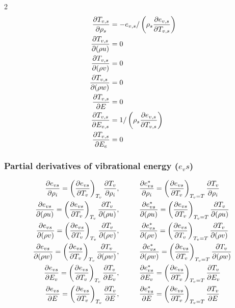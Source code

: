 \documentclass[10pt]{article}
\begin{document}
\begin{flushleft}
\begin{multicols}{2}
\begin{subequations}
    \begin{align}
    \frac{\partial T_{v,s}}{\partial \rho_s} &= -e_{v,s} / \left( \rho_s \frac{\partial e_{v,s}}{\partial T_{v,s}} \right)
    \\ \frac{\partial T_{v,s}}{\partial (\rho u)} &= 0
    \\ \frac{\partial T_{v,s}}{\partial (\rho v)} &= 0
    \\ \frac{\partial T_{v,s}}{\partial (\rho w)} &= 0
    \\ \frac{\partial T_{v,s}}{\partial E} &= 0
    \\ \frac{\partial T_{v,s}}{\partial E_{v,s}} &= 1 / \left( \rho_s \frac{\partial e_{v,s}}{\partial T_{v,s}} \right)
    \\ \frac{\partial T_{v,s}}{\partial E_e} &= 0
    \end{align}
\end{subequations}

\end{multicols}

\subsubsection{Partial derivatives of vibrational energy ($e_vs$)}

\begin{subequations}
    \begin{align}
        \pd{e_{vs}}{\rho_i} = \bp{\pd{e_{vs}}{T_v}}_{T_v} \pd{T_v}{\rho_i}, &\hspace{10mm} \pd{e_{vs}^*}{\rho_i} =  \bp{\pd{e_{vs}}{T_v}}_{T_v  = T} \pd{T_v}{\rho_i}
        \\ \pd{e_{vs}}{(\rho u)} = \bp{\pd{e_{vs}}{T_v}}_{T_v} \pd{T_v}{(\rho u)}, &\hspace{10mm} \pd{e_{vs}^*}{(\rho u)} = \bp{\pd{e_{vs}}{T_v}}_{T_v  = T} \pd{T_v}{(\rho u)}
        \\ \pd{e_{vs}}{(\rho v)} = \bp{\pd{e_{vs}}{T_v}}_{T_v} \pd{T_v}{(\rho v)}, &\hspace{10mm} \pd{e_{vs}^*}{(\rho v)} = \bp{\pd{e_{vs}}{T_v}}_{T_v  = T} \pd{T_v}{(\rho v)}
        \\ \pd{e_{vs}}{(\rho w)} = \bp{\pd{e_{vs}}{T_v}}_{T_v} \pd{T_v}{(\rho w)}, &\hspace{10mm} \pd{e_{vs}^*}{(\rho w)} = \bp{\pd{e_{vs}}{T_v}}_{T_v  = T} \pd{T_v}{(\rho w)}
        \\ \pd{e_{vs}}{E_v} = \bp{\pd{e_{vs}}{T_v}}_{T_v} \pd{T_v}{E_v}, &\hspace{10mm} \pd{e_{vs}^*}{E_v} = \bp{\pd{e_{vs}}{T_v}}_{T_v  = T} \pd{T_v}{E_v}
        \\ \pd{e_{vs}}{E} = \bp{\pd{e_{vs}}{T_v}}_{T_v} \pd{T_v}{E}, &\hspace{10mm} \pd{e_{vs}^*}{E} = \bp{\pd{e_{vs}}{T_v}}_{T_v  = T} \pd{T_v}{E}
    \end{align}    
\end{subequations}





\end{flushleft}
\end{document}
